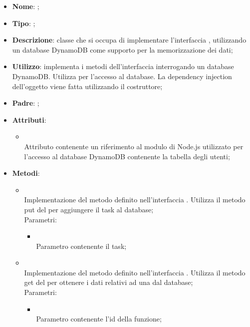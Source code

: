 \begin{itemize}
	\item \textbf{Nome}: ;
	\item \textbf{Tipo}: ;
	\item \textbf{Descrizione}: classe che si occupa di implementare l'interfaccia , utilizzando un database DynamoDB come supporto per la memorizzazione dei dati;
	\item \textbf{Utilizzo}: implementa i metodi dell'interfaccia  interrogando un database DynamoDB. Utilizza  per l'accesso al database. La dependency injection dell'oggetto  viene fatta utilizzando il costruttore;
	\item \textbf{Padre}: ;
	\item \textbf{Attributi}:
	\begin{itemize}
		\item[]  \\
		Attributo contenente un riferimento al modulo di Node.js utilizzato per l'accesso al database DynamoDB contenente la tabella degli utenti;
	\end{itemize}
	\item \textbf{Metodi}:
	\begin{itemize}
		\item[]  \\
		Implementazione del metodo definito nell'interfaccia . Utilizza il metodo put del  per aggiungere il task al database;\\
		Parametri:
		\begin{itemize}
			\item {} \\
			Parametro contenente il task;
		\end{itemize}
		\item[]  \\
		Implementazione del metodo definito nell'interfaccia . Utilizza il metodo get del  per ottenere i dati relativi ad una  dal database;\\
		Parametri:
		\begin{itemize}
			\item {} \\
			Parametro contenente l'id della funzione;

\end{itemize}
\end{itemize}
\end{itemize}
